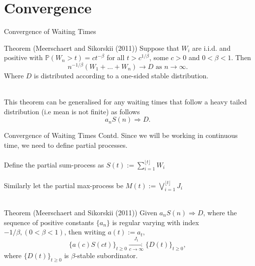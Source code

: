 \documentclass{beamer}
\newcommand{\Prob}{\mathbb{P}}
\begin{document}
\section{Convergence}

\begin{frame}{Convergence of Waiting Times}
	
	\begin{block}{Theorem (Meerschaert and Sikorskii (2011))}
		Suppose that $W_i$ are i.i.d. and positive with $\Prob(W_n>t)=ct^{-\beta}$ for all $t>c^{1/\beta}$, some $c>0$ and $0<\beta<1$. Then
		\[
		    n^{-1/\beta}(W_1+...+W_n) \to D \textrm{ as } n\to \infty.
		\]
		Where $D$ is distributed according to a one-sided stable distribution.
		\\~\\
	\end{block}

	This theorem can be generalised for any waiting times that follow a heavy tailed distribution (i.e mean is not finite) as follows
	\begin{equation*}
	    a_nS(n) \Rightarrow D.
	\end{equation*}
	
	
\end{frame}

\begin{frame}{Convergence of Waiting Times Contd.}
	Since we will be working in continuous time, we need to define partial processes.
	\\~\\
	Define the partial sum-process as $S(t):=\sum^{\lfloor{t}\rfloor}_{i=1} W_i$
    \\~\\
    Similarly let the partial max-process be $M(t):=\bigvee_{i=1}^{\lfloor{t}\rfloor} J_i$
    \\~\\
    \begin{block}{Theorem (Meerschaert and Sikorskii (2011))}
		Given $a_nS(n)\Rightarrow D$, where the sequence of positive constants $\{a_n\}$ is regular varying with index $-1/\beta, (0<\beta<1)$, then writing $a(t):=a_t,$
		\[
		    \{a(c)S(ct)\}_{t\geq0} \xrightarrow[c\to \infty]{J_1} \{D(t)\}_{t\geq0},
		\]
		where $\{D(t)\}_{t\geq0}$ is $\beta$-stable subordinator.
	\end{block}
\end{frame}
\end{document}
